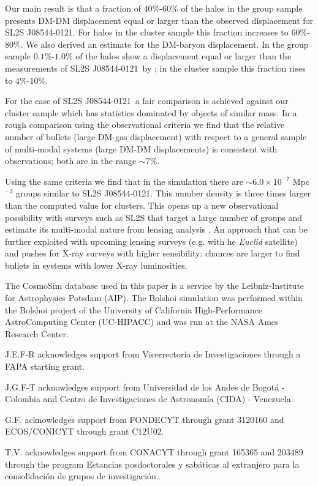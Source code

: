 \documentclass{emulateapj}
\newcommand{\bullg}{SL2S J08544-0121}
\begin{document}
Our main result is that a fraction of $40\%$-$60\%$ of the halos
in the group sample presents DM-DM displacement equal or larger than the
observed displacement for \bullg. For halos in the cluster sample this
fraction increases to $60\%$-$80\%$. We also derived an
estimate for the DM-baryon displacement. In the group sample
$0.1\%$-$1.0\%$ of the halos show a displacement equal or larger than
the  measurements of \bullg\ by \cite{Gastaldello}; in the cluster
sample this fraction rises to $4\%$-$10\%$. 

For the case of \bullg\ a fair comparison is achieved against our cluster
sample which has statistics dominated by objects of similar mass. In
a rough comparison using the observational criteria \citep{Foex2013,
  Gastaldello} we find that the relative number of bullets
(large DM-gas displacement) with respect to a general sample of
multi-modal systems (large DM-DM displacements) is consistent with
observations; both are in the range $\sim 7\%$. 

Using the same criteria we find that in the simulation there are
$\sim 6.0\times 10^{-7}$ Mpc$^{-3}$ groups similar to \bullg. This
number density is three times larger than the computed value for
clusters. This opens up a new observational possibility with surveys
such as SL2S that target a large number of groups and estimate its
multi-modal nature from lensing analysis \citep{Foex2013}. An approach
that can be further exploited with upcoming lensing surveys (e.g. with
 he {\it Euclid} satellite) and pushes for X-ray surveys with higher
sensibility: chances are larger to find bullets in systems with lower
X-ray luminosities.

The CosmoSim database used in this paper is a service by the
Leibniz-Institute for Astrophysics Potsdam (AIP). The  Bolshoi
simulation was performed within the Bolshoi project of the University
of California High-Performance AstroComputing Center (UC-HIPACC) and
was run at the NASA Ames Research Center. 

J.E.F-R acknowledges support from Vicerrector\'ia de
Investigaciones through a FAPA starting grant.

J.G.F-T acknowledges support from Universidad de los Andes de Bogot\'a
- Colombia and Centro de Investigaciones de Astronom\'ia (CIDA) -
Venezuela. 

G.F. acknowledges support from FONDECYT through grant 3120160 and
ECOS/CONICYT through grant C12U02.  

T.V. acknowledges support from CONACYT through grant 165365 and
203489 through the program Estancias posdoctorales y sab\'aticas al
extranjero para la consolidaci\'on de grupos de investigaci\'on.  
\end{document}
